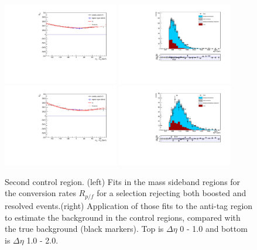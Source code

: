 \begin{figure}[h]
\centering
\includegraphics[width=0.45\textwidth]{F5/HH4b2p1SR_Fit_BG_boostres_dEta0_CR2.pdf}
\includegraphics[width=0.45\textwidth]{F5/HH4b2p1_Plot_BG_boostres_dEta0_CR2.pdf}\\
\includegraphics[width=0.45\textwidth]{F5/HH4b2p1SR_Fit_BG_boostres_dEta1_CR2.pdf}
\includegraphics[width=0.45\textwidth]{F5/HH4b2p1_Plot_BG_boostres_dEta1_CR2.pdf}
\caption{Second control region. (left) Fits in the mass sideband regions for the conversion rates $R_{p/f}$ for a selection rejecting both boosted and resolved events.(right) Application of those fits to the anti-tag region to estimate the background in the control regions, compared with the true background (black markers). Top is $\Delta\eta$ 0 - 1.0 and bottom is $\Delta\eta$ 1.0 - 2.0.}
\label{fig:closuredataboostres2}
\end{figure}

